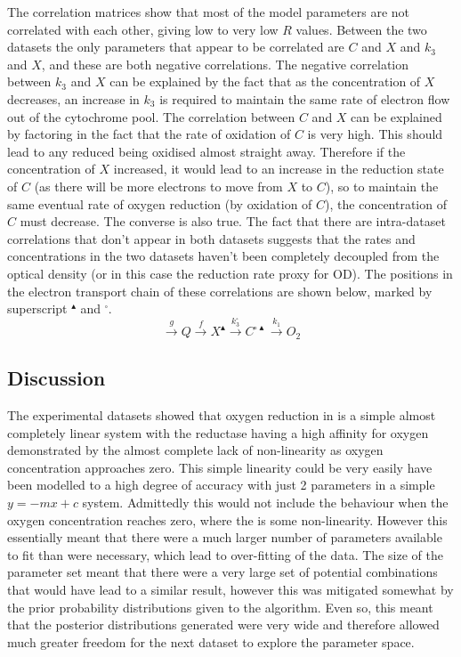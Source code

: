 The correlation matrices show that most of the model parameters are not correlated with each other, giving low to very low $R$ values. Between the two datasets the only parameters that appear to be correlated are $C$ and $X$ and $k_3$ and $X$, and these are both negative correlations. The negative correlation between $k_3$ and $X$ can be explained by the fact that as the concentration of $X$ decreases, an increase in $k_3$ is required to maintain the same rate of electron flow out of the cytochrome pool. The correlation between $C$ and $X$ can be explained by factoring in the fact that the rate of oxidation of $C$ is very high. This should lead to any reduced \cbbthree{} being oxidised almost straight away. Therefore if the concentration of $X$ increased, it would lead to an increase in the reduction state of $C$ (as there will be more electrons to move from $X$ to $C$), so to maintain the same eventual rate of oxygen reduction (by oxidation of $C$), the concentration of $C$ must decrease. The converse is also true.
The fact that there are intra-dataset correlations that don't appear in both datasets suggests that the rates and concentrations in the two datasets haven't been completely decoupled from the optical density (or in this case the reduction rate proxy for OD). The positions in the electron transport chain of these correlations are shown below, marked by superscript $^\blacktriangle$ and $^\square$.
\begin{equation*}
\xrightarrow{g}Q\xrightarrow{f}X^{\blacktriangle}\xrightarrow{k_3^{\square}}C^{\square\blacktriangle}\xrightarrow{k_1}O_2
\end{equation*}

\subsection{Discussion}
The experimental datasets showed that oxygen reduction in \Nm{} is a simple almost completely linear system with the reductase having a high affinity for oxygen demonstrated by the almost complete lack of non-linearity as oxygen concentration approaches zero. This simple linearity could be very easily have been modelled to a high degree of accuracy with just 2 parameters in a simple $y=-mx+c$ system. Admittedly this would not include the behaviour when the oxygen concentration reaches zero, where the is some non-linearity. However this essentially meant that there were a much larger number of parameters available to fit than were necessary, which lead to over-fitting of the data. The size of the parameter set meant that there were a very large set of potential combinations that would have lead to a similar result, however this was mitigated somewhat by the prior probability distributions given to the algorithm. Even so, this meant that the posterior distributions generated were very wide and therefore allowed much greater freedom for the next dataset to explore the parameter space.

